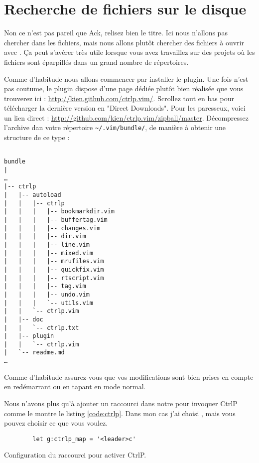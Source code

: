 \section{Recherche de fichiers sur le disque}

Non ce n'est pas pareil que Ack, relisez bien le titre. Ici nous n'allons pas chercher dans les fichiers, mais nous allons plutôt chercher des fichiers à ouvrir avec \vim. Ça peut s'avérer très utile lorsque vous avez travaillez sur des projets où les fichiers sont éparpillés dans un grand nombre de répertoires.

Comme d'habitude nous allons commencer par installer le plugin. Une fois n'est pas coutume, le plugin dispose d'une page dédiée plutôt bien réalisée que vous trouverez ici : \url{http://kien.github.com/ctrlp.vim/}. Scrollez tout en bas pour télécharger la dernière version en "Direct Downloads". Pour les paresseux, voici un lien direct : \url{http://github.com/kien/ctrlp.vim/zipball/master}. Décompressez l'archive dan votre répertoire \Verb|~/.vim/bundle/|, de manière à obtenir une structure de ce type :

\begin{verbatim}

bundle
|
…
|-- ctrlp
|   |-- autoload
|   |   |-- ctrlp
|   |   |   |-- bookmarkdir.vim
|   |   |   |-- buffertag.vim
|   |   |   |-- changes.vim
|   |   |   |-- dir.vim
|   |   |   |-- line.vim
|   |   |   |-- mixed.vim
|   |   |   |-- mrufiles.vim
|   |   |   |-- quickfix.vim
|   |   |   |-- rtscript.vim
|   |   |   |-- tag.vim
|   |   |   |-- undo.vim
|   |   |   `-- utils.vim
|   |   `-- ctrlp.vim
|   |-- doc
|   |   `-- ctrlp.txt
|   |-- plugin
|   |   `-- ctrlp.vim
|   `-- readme.md
…
\end{verbatim}

Comme d'habitude assurez-vous que vos modifications sont bien prises en compte en redémarrant \vim ou en tapant  en mode normal.

Nous n'avons plus qu'à ajouter un raccourci dans notre \vimrc pour invoquer CtrlP comme le montre le listing \ref{code:ctrlp}. Dans mon cas j'ai choisi , mais vous pouvez choisir ce que vous voulez.

\begin{listing}[H]

    \begin{verbatim}
        let g:ctrlp_map = '<leader>c'
    \end{verbatim}
    \caption{Configuration du raccourci pour activer CtrlP.}
    \label{code:ctrlp}
\end{listing}


